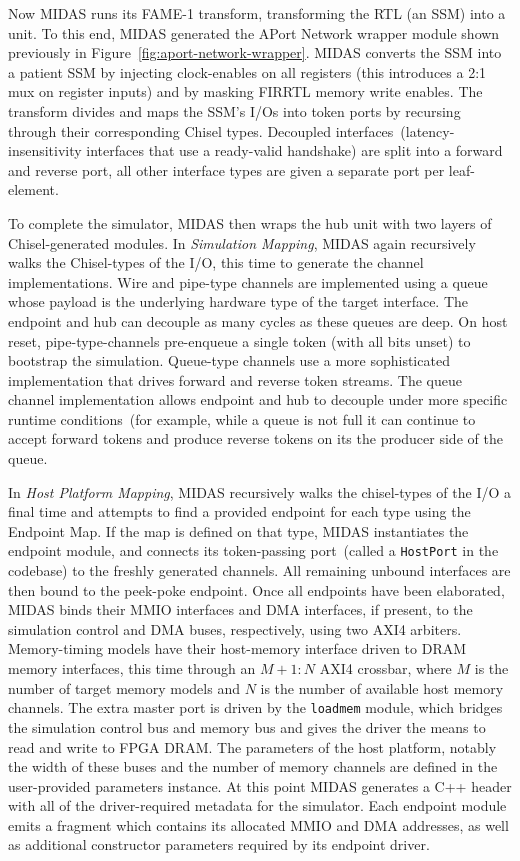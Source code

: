 Now MIDAS runs its FAME-1 transform, transforming the RTL (an SSM) into a
unit. To this end, MIDAS generated the APort Network wrapper module shown previously in Figure~\ref{fig:aport-network-wrapper}.
MIDAS converts the SSM into a patient SSM by injecting clock-enables
on all registers (this introduces a 2:1 mux on register inputs) and by
masking FIRRTL memory write enables. The transform divides and maps the
SSM's I/Os into token ports by recursing through their corresponding Chisel types.
Decoupled interfaces~(latency-insensitivity interfaces that use a ready-valid
handshake) are split into a forward and reverse port, all other
interface types are given a separate port per leaf-element.

To complete the simulator, MIDAS then wraps the hub unit with two layers of Chisel-generated modules.
In \emph{Simulation Mapping}, MIDAS again recursively walks the Chisel-types of the I/O, this time
to generate the channel implementations.  Wire and pipe-type channels are implemented using a queue whose
payload is the underlying hardware type of the target interface. The endpoint and hub can decouple
as many cycles as these queues are deep. On host reset, pipe-type-channels
pre-enqueue a single token (with all bits unset) to bootstrap the simulation.
Queue-type channels use a more sophisticated implementation
that drives forward and reverse token streams. The queue channel
implementation allows endpoint and hub to decouple under more specific runtime conditions~(for example,
while a queue is not full it can continue to accept forward tokens and produce reverse tokens on its the producer side
of the queue.

In \emph{Host Platform Mapping}, MIDAS recursively walks the chisel-types
of the I/O a final time and attempts to find a provided endpoint for
each type using the Endpoint Map. If the map is defined on that type, MIDAS
instantiates the endpoint module, and connects its token-passing port~(called a \texttt{HostPort} in the codebase) to the freshly
generated channels. All remaining unbound interfaces are then bound to the
peek-poke endpoint. Once all endpoints have been elaborated, MIDAS binds their
MMIO interfaces and DMA interfaces, if present, to the simulation control
and DMA buses, respectively, using two AXI4 arbiters. Memory-timing
models have their host-memory interface driven to DRAM memory interfaces,
this time through an $M+1:N$ AXI4 crossbar, where $M$ is the number of
target memory models and $N$ is the number of available host memory channels. The
extra master port is driven by the \texttt{loadmem} module, which bridges the
simulation control bus and memory bus and gives the driver the means to
read and write to FPGA DRAM. The parameters of the host platform,
notably the width of these buses and the number of memory channels
are defined in the user-provided parameters instance. At this point MIDAS
generates a C++ header with all of the driver-required metadata for the
simulator. Each endpoint module emits a fragment which contains its allocated MMIO and
DMA addresses, as well as additional constructor parameters required by its
endpoint driver.

